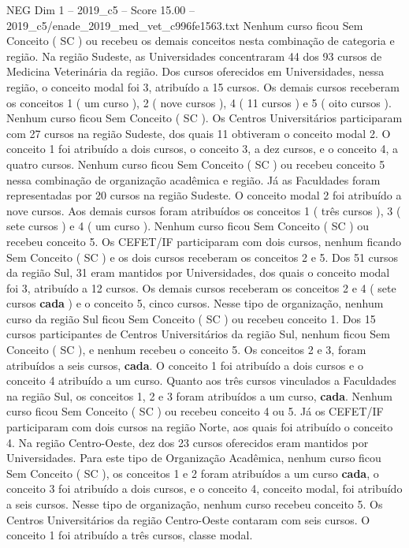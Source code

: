 \begin{textsample}{NEG Dim 1 – 2019\_c5 – Score 15.00 – 2019\_c5/enade\_2019\_med\_vet\_c996fe1563.txt}
Nenhum curso ficou Sem Conceito ( SC ) ou recebeu os demais conceitos nesta combinação de categoria e região.
Na região Sudeste, as Universidades concentraram 44 dos 93 cursos de Medicina Veterinária da região.
Dos cursos oferecidos em Universidades, nessa região, o conceito modal foi 3, atribuído a 15 cursos.
Os demais cursos receberam os conceitos 1 ( um curso ), 2 ( nove cursos ), 4 ( 11 cursos ) e 5 ( oito cursos ).
Nenhum curso ficou Sem Conceito ( SC ).
Os Centros Universitários participaram com 27 cursos na região Sudeste, dos quais 11 obtiveram o conceito modal 2.
O conceito 1 foi atribuído a dois cursos, o conceito 3, a dez cursos, e o conceito 4, a quatro cursos.
Nenhum curso ficou Sem Conceito ( SC ) ou recebeu conceito 5 nessa combinação de organização acadêmica e região.
Já as Faculdades foram representadas por 20 cursos na região Sudeste.
O conceito modal 2 foi atribuído a nove cursos.
Aos demais cursos foram atribuídos os conceitos 1 ( três cursos ), 3 ( sete cursos ) e 4 ( um curso ).
Nenhum curso ficou Sem Conceito ( SC ) ou recebeu conceito 5.
Os CEFET/IF participaram com dois cursos, nenhum ficando Sem Conceito ( SC ) e os dois cursos receberam os conceitos 2 e 5.
Dos 51 cursos da região Sul, 31 eram mantidos por Universidades, dos quais o conceito modal foi 3, atribuído a 12 cursos.
Os demais cursos receberam os conceitos 2 e 4 ( sete cursos \textbf{cada} ) e o conceito 5, cinco cursos.
Nesse tipo de organização, nenhum curso da região Sul ficou Sem Conceito ( SC ) ou recebeu conceito 1.
Dos 15 cursos participantes de Centros Universitários da região Sul, nenhum ficou Sem Conceito ( SC ), e nenhum recebeu o conceito 5.
Os conceitos 2 e 3, foram atribuídos a seis cursos, \textbf{cada}.
O conceito 1 foi atribuído a dois cursos e o conceito 4 atribuído a um curso.
Quanto aos três cursos vinculados a Faculdades na região Sul, os conceitos 1, 2 e 3 foram atribuídos a um curso, \textbf{cada}.
Nenhum curso ficou Sem Conceito ( SC ) ou recebeu conceito 4 ou 5.
Já os CEFET/IF participaram com dois cursos na região Norte, aos quais foi atribuído o conceito 4.
Na região Centro-Oeste, dez dos 23 cursos oferecidos eram mantidos por Universidades.
Para este tipo de Organização Acadêmica, nenhum curso ficou Sem Conceito ( SC ), os conceitos 1 e 2 foram atribuídos a um curso \textbf{cada}, o conceito 3 foi atribuído a dois cursos, e o conceito 4, conceito modal, foi atribuído a seis cursos.
Nesse tipo de organização, nenhum curso recebeu conceito 5.
Os Centros Universitários da região Centro-Oeste contaram com seis cursos.
O conceito 1 foi atribuído a três cursos, classe modal.

\end{textsample}

